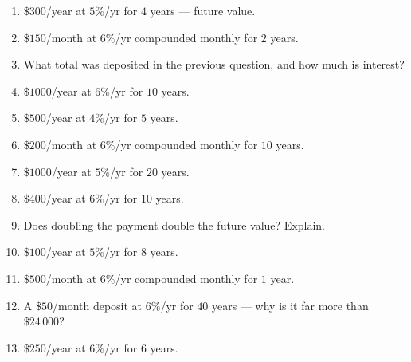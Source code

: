 \documentclass[11pt]{article}
\begin{document}
\begin{recapbox}
\begin{multicols}{2}
\small
\begin{enumerate}[leftmargin=*,itemsep=3pt]
  \item $\$300$/year at $5\%$/yr for $4$ years — future value.
  \item $\$150$/month at $6\%$/yr compounded monthly for $2$ years.
  \item What total was deposited in the previous question, and how much is interest?
  \item $\$1000$/year at $6\%$/yr for $10$ years.
  \item $\$500$/year at $4\%$/yr for $5$ years.
  \item $\$200$/month at $6\%$/yr compounded monthly for $10$ years.
  \item $\$1000$/year at $5\%$/yr for $20$ years.
  \item $\$400$/year at $6\%$/yr for $10$ years.
  \item Does doubling the payment double the future value? Explain.
  \item $\$100$/year at $5\%$/yr for $8$ years.
  \item $\$500$/month at $6\%$/yr compounded monthly for $1$ year.
  \item A $\$50$/month deposit at $6\%$/yr for $40$ years — why is it far more than $\$24\,000$?
  \item $\$250$/year at $6\%$/yr for $6$ years.
\end{enumerate}
\end{multicols}
\end{recapbox}
\end{document}
